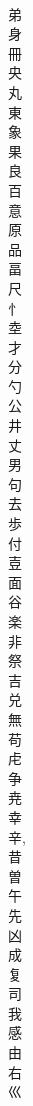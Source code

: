 \documentclass[8pt]{extreport}
\begin{document}
\begin{CJK}{UTF8}{min}
\\	弟	
\\	身	
\\	冊	
\\	央	
\\	丸	
\\	東	
\\	象	
\\	果	
\\	良	
\\	百	
\\	意	
\\	原	
\\	品	
\\	畐	
\\	尺	
\\	忄	
\\	坴	
\\	才	
\\	分	
\\	勺	
\\	公	
\\	井	
\\	丈	
\\	男	
\\	句	
\\	去	
\\	歩	
\\	付	
\\	壴	
\\	面	
\\	谷	
\\	楽	
\\	非	
\\	祭	
\\	吉	
\\	兑	
\\	無	
\\	苟	
\\	虍	
\\	争	
\\	尭	
\\	幸	
\\	辛, 
\\	昔	
\\	曽	
\\	午	
\\	先	
\\	凶	
\\	成	
\\	复	
\\	司	
\\	我	
\\	感	
\\	由	
\\	右	
\\	巛	

\end{CJK}
\end{document}
